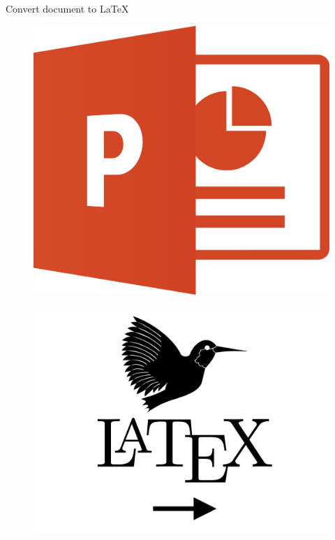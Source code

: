 \documentclass[aspectratio=169]{beamer}
\begin{document}
\begin{frame}{Convert document to \LaTeX}
\begin{minipage}[t]{0.25\linewidth}
\begin{figure}
        \end{figure}
        \vspace{0.1cm}
        \begin{figure}
            \includegraphics[height=0.2\textheight, keepaspectratio]{image/image3.png}
        \end{figure}
    \end{minipage}
    \hfill
    \begin{minipage}[t]{0.45\linewidth}
        \begin{figure}
            \includegraphics[width=\linewidth, keepaspectratio]{image/image4.png}

\end{figure}
\end{minipage}
\end{frame}
\end{document}
